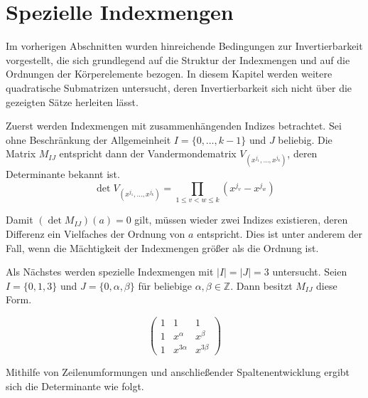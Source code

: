 \section{Spezielle Indexmengen} \label{sec:spezielleIndexmengen}

Im vorherigen Abschnitten wurden hinreichende Bedingungen zur Invertierbarkeit vorgestellt, die sich grundlegend auf die Struktur der Indexmengen und auf die Ordnungen der Körperelemente bezogen. In diesem Kapitel werden weitere quadratische Submatrizen untersucht, deren Invertierbarkeit sich nicht über die gezeigten Sätze herleiten lässt.

Zuerst werden Indexmengen mit zusammenhängenden Indizes betrachtet. Sei ohne Beschränkung der Allgemeinheit $I = \{0,\dots,k-1\}$ und $J$ beliebig. Die Matrix $M_{IJ}$ entspricht dann der Vandermondematrix $V_{(x^{j_1},\dots,x^{j_k})}$, deren Determinante bekannt ist. \cite{VandermondeDet}
\begin{equation*}
    \det V_{(x^{j_1},\dots,x^{j_k})} = \prod_{1\leq v<w\leq k} (x^{j_v} - x^{j_w})
\end{equation*}


Damit $(\det M_{IJ})(a) = 0$ gilt, müssen wieder zwei Indizes existieren, deren Differenz ein Vielfaches der Ordnung von $a$ entspricht. Dies ist unter anderem der Fall, wenn die Mächtigkeit der Indexmengen größer als die Ordnung ist.

\begin{sloppypar}
    Als Nächstes werden spezielle Indexmengen mit $|I| = |J| = 3$ untersucht. Seien ${I = \{0, 1, 3\}}$ und $J = \{0, \alpha, \beta\}$ für beliebige $\alpha,\beta \in \mathbb{Z}$. Dann besitzt $M_{IJ}$ diese Form.
\end{sloppypar}
\begin{equation*}
    \begin{pmatrix}
        1 & 1 & 1 \\
        1 & x^{\alpha} & x^{\beta} \\
        1 & x^{3\alpha} & x^{3\beta}
    \end{pmatrix}
\end{equation*}

Mithilfe von Zeilenumformungen und anschließender Spaltenentwicklung ergibt sich die Determinante wie folgt.

